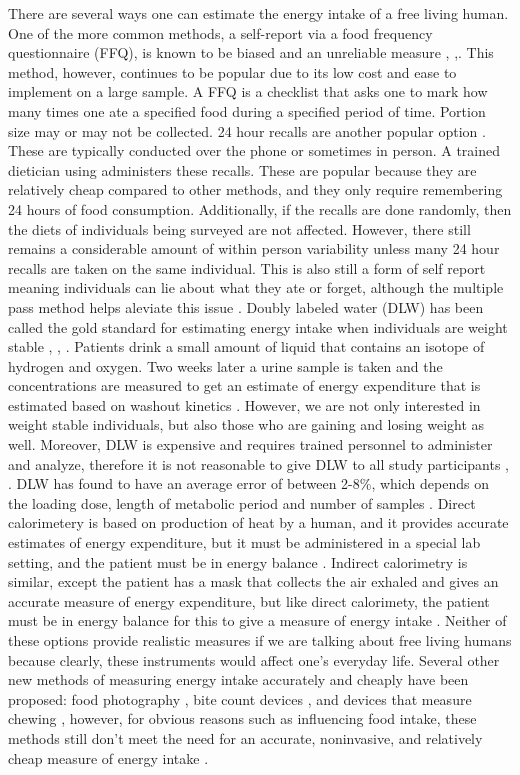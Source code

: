 \documentclass[11pt]{article}\usepackage[]{graphicx}\usepackage[]{color}
\begin{document}
There are several ways one can estimate the energy intake of a free living human. One of the more common methods, a self-report via a food frequency questionnaire (FFQ), is known to be biased and an unreliable measure \cite{schoeller}, \cite{freedman},\cite{schaefer00}. This method, however, continues to be popular due to its low cost and ease to implement on a large sample. A FFQ is a checklist that asks one to mark how many times one ate a specified food during a specified period of time. Portion size may or may not be collected. 24 hour recalls are another popular option \cite{rjohnson}. These are typically conducted over the phone or sometimes in person. A trained dietician using administers these recalls. These are popular because they are relatively cheap compared to other methods, and they only require remembering 24 hours of food consumption. Additionally, if the recalls are done randomly, then the diets of individuals being surveyed are not affected. However, there still remains a considerable amount of within person variability unless many 24 hour recalls are taken on the same individual. This is also still a form of self report meaning individuals can lie about what they ate or forget, although the multiple pass method helps aleviate this issue \cite{raper}. Doubly labeled water (DLW) has been called the gold standard for estimating energy intake when individuals are weight stable \cite{gilmore}, \cite{hall11}, \cite{thomas11a}. Patients drink a small amount of liquid that contains an isotope of hydrogen and oxygen. Two weeks later a urine sample is taken and the concentrations are measured to get an estimate of energy expenditure that is estimated based on washout kinetics \cite{thomas11a}. However, we are not only interested in weight stable individuals, but also those who are gaining and losing weight as well. Moreover, DLW is expensive and requires trained personnel to administer and analyze, therefore it is not reasonable to give DLW to all study participants \cite{hall14}, \cite{thomas11a}. DLW has found to have an average error of between 2-8\%, which depends on the loading dose, length of metabolic period and number of samples \cite{schoeller88}. Direct calorimetery is based on production of heat by a human, and it provides accurate estimates of energy expenditure, but it must be administered in a special lab setting, and the patient must be in energy balance \cite{laporte85}. Indirect calorimetry is similar, except the patient has a mask that collects the air exhaled and gives an accurate measure of energy expenditure, but like direct calorimety,  the patient must be in energy balance for this to give a measure of energy intake \cite{laporte85}. Neither of these options provide realistic measures if we are talking about free living humans because clearly, these instruments would affect one's everyday life. Several other new methods of measuring energy intake accurately and cheaply have been proposed: food photography \cite{daugherty12}, bite count devices \cite{fontana15}, and devices that measure chewing \cite{scisco13}, however, for obvious reasons such as influencing food intake, these methods still don't meet the need for an accurate, noninvasive, and relatively cheap measure of energy intake \cite{sanghvi15}.
\end{document}
